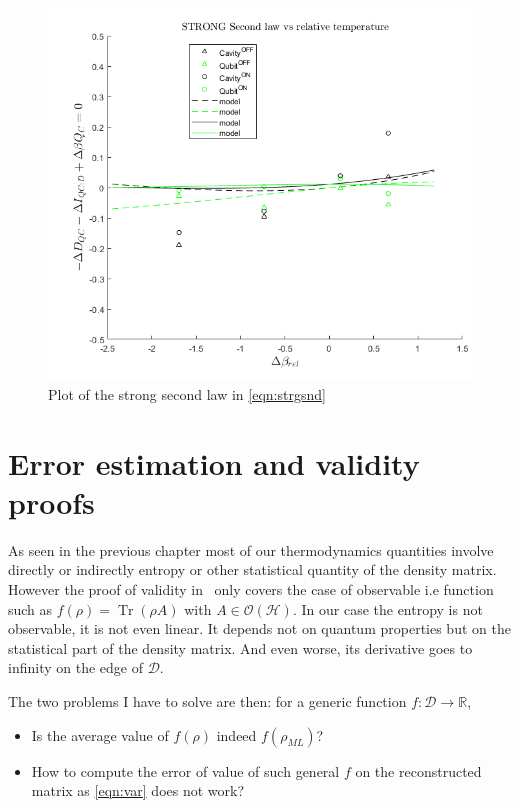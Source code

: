 \documentclass[10pt,a4paper]{report}
\theoremstyle{plain}
\theoremstyle{definition}
\theoremstyle{remark}
\newcommand{\R}{\ensuremath{\mathbb{R}}}
\DeclareMathOperator{\Tr}{Tr}
\newcommand{\ml}{_{M\!L}}
\begin{document}
\begin{figure}
  \centering
  \includegraphics[height=0.45\textheight]{plots/Strg1.png}
  \caption{Plot of the strong second law in \cref{eqn:strgsnd}}\label{fig:strg1}
\end{figure}

\chapter{Error estimation and validity proofs}

As seen in the previous chapter most of our thermodynamics quantities involve
directly or indirectly entropy or other statistical quantity of the density
matrix. However the proof of validity in~\cite{SPRAL17} only covers the case of
observable i.e function such as $f(\rho) = \Tr(\rho A)$ with $A \in
\mathcal{O}(\mathcal{H})$. In our case the entropy is not observable, it is not even
linear. It depends not on quantum properties but on the statistical part of the
density matrix. And even worse, its derivative goes to infinity on the edge of
$\mathcal{D}$.

The two problems I have to solve are then:
for a generic function $f : \mathcal{D}
\to \R$,
\begin{itemize}
\item Is the average value of $f(\rho)$ indeed $f(\rho\ml)$?
\item How to compute the error of value of such general $f$ on the reconstructed
  matrix as \cref{eqn:var} does not work?
\end{itemize}
\end{document}
